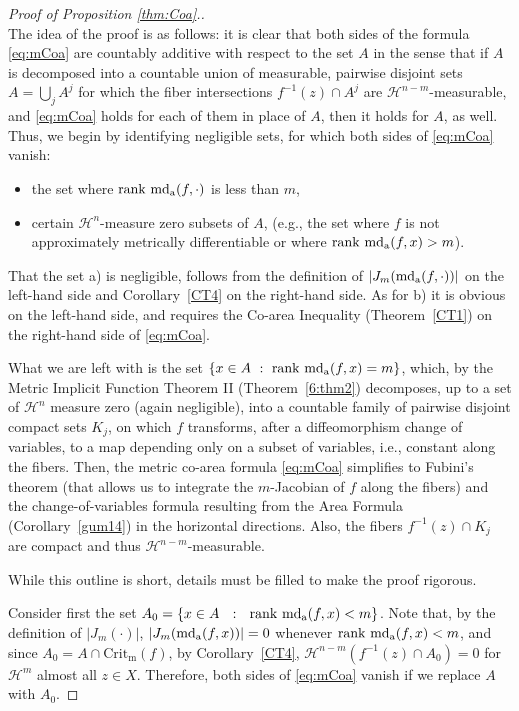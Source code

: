 \documentclass[12pt,leqno]{amsart}
\theoremstyle{definition}
\def\H{{\mathcal H}}
\def\rank{{\rm rank\,}}
\def\apmd{\operatorname{md_{\rm a}}}
\numberwithin{theorem}{section} \numberwithin{equation}{section}
\begin{document}
\begin{proof}[Proof of Proposition \ref{thm:Coa}.]\mbox{}\\
The idea of the proof is as follows: it is clear that both sides of the formula \eqref{eq:mCoa} are countably additive with respect to the set $A$ in the sense that if $A$ is decomposed into a countable union of measurable, pairwise disjoint sets $A=\bigcup_j A^j$ for which the fiber intersections $f^{-1}(z)\cap A^j$ are $\H^{n-m}$-measurable, and \eqref{eq:mCoa} holds for each of them in place of $A$, then it holds for $A$, as well. Thus, we begin by identifying negligible sets, for which both sides of \eqref{eq:mCoa} vanish:
\begin{itemize}
    \item[a)] the set where $\rank \apmd(f,\cdot)$ is less than $m$,
    \item[b)] certain $\H^n$-measure zero subsets of $A$, (e.g., the set where $f$ is not approximately metrically differentiable or where $\rank \apmd(f,x)>m$).
\end{itemize}
That the set a) is negligible, follows from the definition of $|J_m(\apmd(f,\cdot))|$ on the left-hand side and Corollary~\ref{CT4} on the right-hand side. As for b) it is obvious on the left-hand side, and requires the Co-area Inequality (Theorem~\ref{CT1}) on the right-hand side of \eqref{eq:mCoa}.

What we are left with is the set $\{x\in A~:~\rank \apmd(f,x)=m\}$, which, by the Metric Implicit Function Theorem II (Theorem~\ref{6:thm2}) decomposes, up to a set of $\H^n$ measure zero (again negligible), into a countable family of pairwise disjoint compact sets $K_j$, on which $f$ transforms, after a diffeomorphism change of variables, to a map depending only on a subset of variables, i.e., constant along the fibers. Then, the metric co-area formula \eqref{eq:mCoa} simplifies to Fubini's theorem (that allows us to integrate the $m$-Jacobian of $f$ along the fibers) and the change-of-variables formula resulting from the Area Formula (Corollary~\ref{gum14}) in the horizontal directions. Also, the fibers $f^{-1}(z)\cap K_j$ are compact and thus $\H^{n-m}$-measurable.

While this outline is short, details must be filled to make the proof rigorous.


Consider first the set $A_0=\{x\in A~~:~~\rank \apmd(f,x)<m\}$. Note that, by the definition of $|J_m(\cdot)|$,  $|J_m(\apmd(f,x))|=0$ whenever $\rank\apmd(f,x)<m$, and since $A_0=A\cap \mathrm{Crit_m} (f)$, by Corollary~\ref{CT4},
$\H^{n-m}(f^{-1}(z)\cap A_0)=0$ for $\H^m$ almost all $z\in X$.
Therefore, both sides of \eqref{eq:mCoa} vanish if we replace $A$ with $A_0$.


\end{proof}
\end{document}
